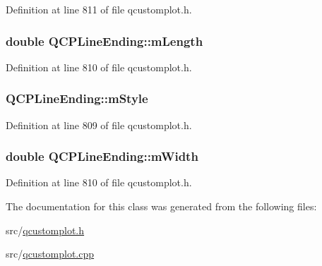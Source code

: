 Definition at line 811 of file qcustomplot.\-h.

\hypertarget{class_q_c_p_line_ending_ae8e1e2566b96c05736cd92662dba8af8}{
\subsubsection[{m\-Length}]{\setlength{\rightskip}{0pt plus 5cm}double Q\-C\-P\-Line\-Ending\-::m\-Length\hspace{0.3cm}{\ttfamily [protected]}}}\label{class_q_c_p_line_ending_ae8e1e2566b96c05736cd92662dba8af8}


Definition at line 810 of file qcustomplot.\-h.

\hypertarget{class_q_c_p_line_ending_a4696fc9117b60f1ca7690fcd2ba56611}{
\subsubsection[{m\-Style}]{ Q\-C\-P\-Line\-Ending\-::m\-Style\hspace{0.3cm}{\ttfamily [protected]}}}\label{class_q_c_p_line_ending_a4696fc9117b60f1ca7690fcd2ba56611}


Definition at line 809 of file qcustomplot.\-h.

\hypertarget{class_q_c_p_line_ending_aca89d21341133c20dc6825c33a5eac48}{
\subsubsection[{m\-Width}]{\setlength{\rightskip}{0pt plus 5cm}double Q\-C\-P\-Line\-Ending\-::m\-Width\hspace{0.3cm}{\ttfamily [protected]}}}\label{class_q_c_p_line_ending_aca89d21341133c20dc6825c33a5eac48}


Definition at line 810 of file qcustomplot.\-h.



The documentation for this class was generated from the following files\-:\begin{DoxyCompactItemize}
\item 
src/\hyperlink{qcustomplot_8h}{qcustomplot.\-h}\item 
src/\hyperlink{qcustomplot_8cpp}{qcustomplot.\-cpp}\end{DoxyCompactItemize}
